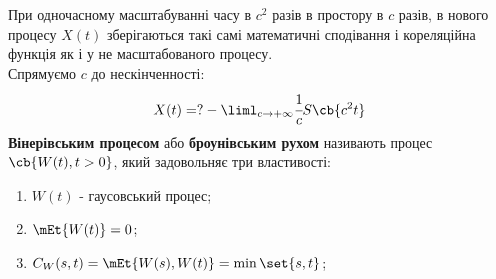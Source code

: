 При одночасному масштабуванні часу в $c^2$ разів в простору в $c$ разів, в нового процесу $X(t)$ зберігаються такі самі математичні сподівання і кореляційна функція як і у не масштабованого процесу.\\
Спрямуємо $c$ до нескінченності:
\begin{equation}
X(t)=?-\liml_{c\to+\infty} \cfrac1c S\cb{c^2t}
\end{equation}
\textbf{Вінерівським процесом} або \textbf{броунівським рухом} називають процес $\cb{W(t),t>0}$, який задовольняє три властивості:
\begin{enumerate}
\item $W(t)$ - гаусовський процес;
\item $\mEt{W(t)}=0$;
\item $C_W(s,t) = \mEt{W(s),W(t)} = \min\set{s,t}$;
\end{enumerate}
